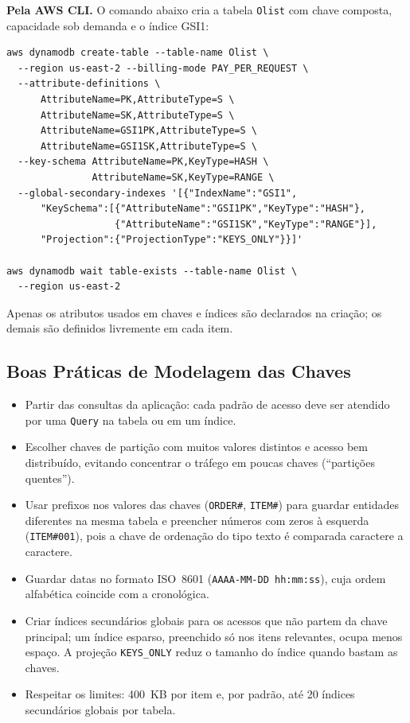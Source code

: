 \documentclass[12pt]{article}
\begin{document}
\textbf{Pela AWS CLI.} O comando abaixo cria a tabela \texttt{Olist} com
chave composta, capacidade sob demanda e o índice GSI1:

{\footnotesize
\begin{verbatim}
aws dynamodb create-table --table-name Olist \
  --region us-east-2 --billing-mode PAY_PER_REQUEST \
  --attribute-definitions \
      AttributeName=PK,AttributeType=S \
      AttributeName=SK,AttributeType=S \
      AttributeName=GSI1PK,AttributeType=S \
      AttributeName=GSI1SK,AttributeType=S \
  --key-schema AttributeName=PK,KeyType=HASH \
               AttributeName=SK,KeyType=RANGE \
  --global-secondary-indexes '[{"IndexName":"GSI1",
      "KeySchema":[{"AttributeName":"GSI1PK","KeyType":"HASH"},
                   {"AttributeName":"GSI1SK","KeyType":"RANGE"}],
      "Projection":{"ProjectionType":"KEYS_ONLY"}}]'

aws dynamodb wait table-exists --table-name Olist \
  --region us-east-2
\end{verbatim}
}

Apenas os atributos usados em chaves e índices são declarados na criação; os
demais são definidos livremente em cada item.

\subsection{Boas Práticas de Modelagem das Chaves}

\begin{itemize}
  \item Partir das consultas da aplicação: cada padrão de acesso deve ser
  atendido por uma \texttt{Query} na tabela ou em um índice.
  \item Escolher chaves de partição com muitos valores distintos e acesso bem
  distribuído, evitando concentrar o tráfego em poucas chaves
  (``partições quentes'').
  \item Usar prefixos nos valores das chaves (\texttt{ORDER\#},
  \texttt{ITEM\#}) para guardar entidades diferentes na mesma tabela e
  preencher números com zeros à esquerda (\texttt{ITEM\#001}), pois a chave
  de ordenação do tipo texto é comparada caractere a caractere.
  \item Guardar datas no formato ISO~8601 (\texttt{AAAA-MM-DD hh:mm:ss}), cuja
  ordem alfabética coincide com a cronológica.
  \item Criar índices secundários globais para os acessos que não partem da
  chave principal; um índice esparso, preenchido só nos itens relevantes,
  ocupa menos espaço. A projeção \texttt{KEYS\_ONLY} reduz o tamanho do
  índice quando bastam as chaves.
  \item Respeitar os limites: 400~KB por item e, por padrão, até 20 índices
  secundários globais por tabela.
\end{itemize}
\end{document}
